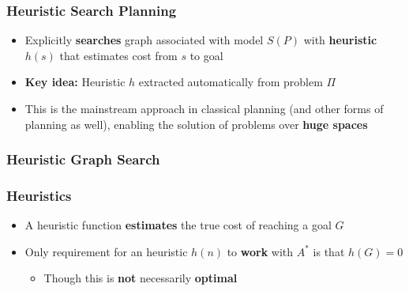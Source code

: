 \documentclass{beamer}
\begin{document}
	\begin{frame}[c]\frametitle{Heuristic Search Planning}
		\begin{itemize}
			\item Explicitly \textbf{searches} graph associated with model $S(P)$ with \textbf{heuristic} $h(s)$ that estimates cost from $s$ to goal
			\item \textbf{Key idea:} Heuristic $h$ extracted automatically from problem $\Pi$
			\item This is the mainstream approach in classical planning (and other forms of planning as well), enabling the solution of problems over \textbf{huge spaces} 
		\end{itemize}
	\end{frame}
	
	\begin{frame}[c]\frametitle{Heuristic Graph Search}
		\begin{algorithmic}[1]
			\small
			   \Loop
				  \EndIf
				  \EndIf
					 
					\EndIf
				  \EndFor
			   \EndLoop
			\EndFunction
		\end{algorithmic}
	\end{frame}
	
	\begin{frame}[c]\frametitle{Heuristics}
		\begin{itemize}
			\item A heuristic function \textbf{estimates} the true cost of reaching a goal $G$
			\item Only requirement for an heuristic $h(n)$ to \textbf{work} with $A^{*}$ is that $h(G)=0$
			\begin{itemize}
				\item Though this is \textbf{not} necessarily \textbf{optimal}
			\end{itemize}
		\end{itemize}
	\end{frame}
\end{document}
